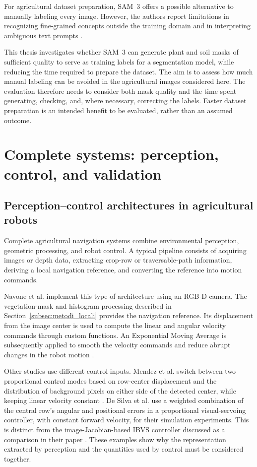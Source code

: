 For agricultural dataset preparation, SAM~3 offers a possible alternative
to manually labeling every image. However, the authors report limitations
in recognizing fine-grained concepts outside the training domain and in
interpreting ambiguous text prompts
\cite[Section~2 and Appendix~C]{carion2026sam3}.

This thesis investigates whether SAM~3 can generate plant and soil masks
of sufficient quality to serve as training labels for a segmentation
model, while reducing the time required to prepare the dataset. The aim
is to assess how much manual labeling can be avoided in the agricultural
images considered here. The evaluation therefore needs to consider both
mask quality and the time spent generating, checking, and, where necessary,
correcting the labels. Faster dataset preparation is an intended benefit
to be evaluated, rather than an assumed outcome.

\section{Complete systems: perception, control, and validation}
\label{sec:sistemi_completi}

\subsection{Perception--control architectures in agricultural robots}
\label{subsec:architetture_percezione_controllo}

Complete agricultural navigation systems combine environmental
perception, geometric processing, and robot control. A typical pipeline
consists of acquiring images or depth data, extracting crop-row or
traversable-path information, deriving a local navigation reference, and
converting the reference into motion commands.

Navone et al. implement this type of architecture using an RGB-D camera.
The vegetation-mask and histogram processing described in
Section~\ref{subsec:metodi_locali} provides the navigation reference.
Its displacement from the image center is used to compute the linear
and angular velocity commands through custom functions. An
Exponential Moving Average is subsequently applied to smooth the velocity
commands and reduce abrupt changes in the robot motion
\cite[Section~3.4]{navone2025gpsfree}.

Other studies use different control inputs. Mendez et al. switch between
two proportional control modes based on row-center displacement and the
distribution of background pixels on either side of the detected center,
while keeping linear velocity constant
\cite[Section~3.5]{mendez2023vineyards}. De Silva et al. use a weighted
combination of the central row's angular and positional errors in a
proportional visual-servoing controller, with constant forward velocity,
for their simulation experiments. This is distinct from the
image-Jacobian-based IBVS controller discussed as a comparison in their
paper \cite[Section~4.3, Eq.~(5)]{silva2023rowdetection}. These examples show
why the representation extracted by perception and the quantities used
by control must be considered together.

